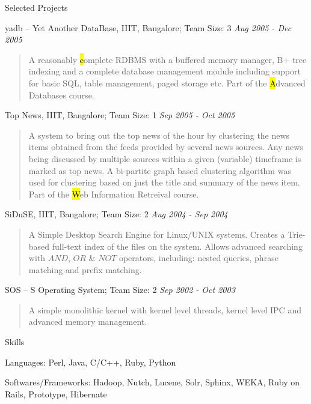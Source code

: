 \documentclass{resume}
\newcommand{\period}{\hfill\small\sl}
\newcommand{\teamsize}{\sc\footnotesize Team Size: }
\begin{document}
\begin{category}{Selected Projects}{}
    \item {\topic yadb -- Yet Another DataBase,} IIIT, Bangalore;
        {\teamsize 3}
        {\period Aug 2005 - Dec 2005}
        \begin{quotation}
            A reasonably {\hl complete RDBMS} with a buffered memory manager, B+
            tree indexing and a complete database management module including
            support for basic SQL, table management, paged storage etc. Part of the
            {\hl Advanced Databases} course.
        \end{quotation}

    \item {\topic Top News,} IIIT, Bangalore;
        {\teamsize 1}
        {\period Sep 2005 - Oct 2005}
        \begin{quotation}
            A system to bring out the top news of the hour by clustering the news
            items obtained from the feeds provided by several news sources. Any
            news being discussed by multiple sources within a given (variable)
            timeframe is marked as top news. A bi-partite graph based clustering
            algorithm was used for clustering based on just the title and summary
            of the news item. Part of the {\hl Web Information Retreival} course.
        \end{quotation}

    \item {\topic SiDuSE,} IIIT, Bangalore;
        {\teamsize 2}
        {\period Aug 2004 - Sep 2004}
        \begin{quotation}
            A Simple Desktop Search Engine for Linux/UNIX systems. Creates a
            Trie-based full-text index of the files on the system. Allows advanced
            searching with $AND$, $OR$ \& $NOT$ operators, including: nested
            queries, phrase matching and prefix matching.
        \end{quotation}

    \item {\topic SOS -- S Operating System;}
        {\teamsize 2}
        {\period Sep 2002 - Oct 2003}
        \begin{quotation}
            A simple monolithic kernel with kernel level threads, kernel level IPC and advanced memory management.
        \end{quotation}

\end{category}


\begin{category}{Skills}{}

    \item {\topic Languages:} Perl, Java, C/C++, Ruby, Python

    \item {\topic Softwares/Frameworks:} Hadoop, Nutch, Lucene, Solr, Sphinx, WEKA,
    Ruby on Rails, Prototype, Hibernate

\end{category}
\end{document}

